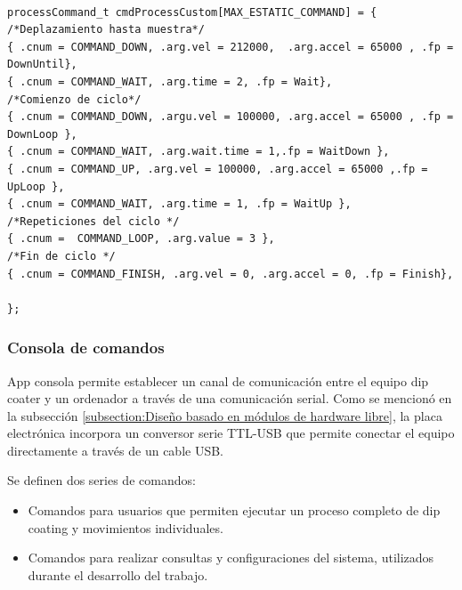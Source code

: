 


\begin{lstlisting}[label=cod:vEstructuraCode,caption=Proceso completo de dip coating.] % 

processCommand_t cmdProcessCustom[MAX_ESTATIC_COMMAND] = {
/*Deplazamiento hasta muestra*/
{ .cnum = COMMAND_DOWN, .arg.vel = 212000,	.arg.accel = 65000 , .fp = DownUntil},
{ .cnum = COMMAND_WAIT, .arg.time = 2, .fp = Wait},
/*Comienzo de ciclo*/
{ .cnum = COMMAND_DOWN, .argu.vel = 100000,	.arg.accel = 65000 , .fp = DownLoop },
{ .cnum = COMMAND_WAIT, .arg.wait.time = 1,.fp = WaitDown },
{ .cnum = COMMAND_UP, .arg.vel = 100000, .arg.accel = 65000 ,.fp = UpLoop },
{ .cnum = COMMAND_WAIT, .arg.time = 1, .fp = WaitUp },
/*Repeticiones del ciclo */
{ .cnum =  COMMAND_LOOP, .arg.value = 3 },
/*Fin de ciclo */
{ .cnum = COMMAND_FINISH, .arg.vel = 0, .arg.accel = 0, .fp = Finish},

};

\end{lstlisting}




\subsubsection{Consola de comandos}
\label{sec:consola_comandos}

App consola permite establecer un canal de comunicación entre el equipo dip coater y un ordenador a través de una comunicación serial. Como se mencionó en la subsección \ref{subsection:Diseño basado en módulos de hardware libre}, la placa electrónica incorpora un conversor serie TTL-USB que permite conectar el  equipo directamente a través de un cable USB. 

Se definen dos series de comandos:
\begin{itemize}
\item Comandos para usuarios que permiten ejecutar un proceso completo de dip coating y movimientos individuales.
\item Comandos para realizar consultas y configuraciones del sistema, utilizados durante el desarrollo del trabajo.
\end{itemize}


